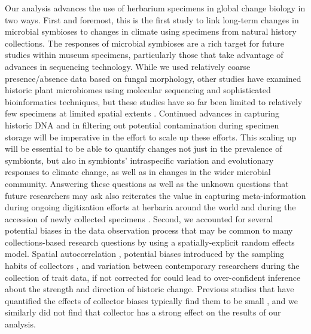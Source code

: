 \documentclass[11pt]{article}
\let\cite\citep
\begin{document}
Our analysis advances the use of herbarium specimens in global change biology in two ways. 
First and foremost, this is the first study to link long-term changes in microbial symbioses to changes in climate using specimens from natural history collections.
The responses of microbial symbioses are a rich target for future studies within museum specimens, particularly those that take advantage of advances in sequencing technology.
While we used relatively coarse presence/absence data based on fungal morphology, other studies have examined historic plant microbiomes using molecular sequencing and sophisticated bioinformatics techniques, but these studies have so far been limited to relatively few specimens at limited spatial extents \cite{yoshida2015computational,heberling2019utilizing, bieker2020metagenomic,gross2021hidden,bradshaw2021global}. 
Continued advances in capturing historic DNA and in filtering out potential contamination during specimen storage \citep{daru2019novel,bakker2020herbarium,raxworthy2021mining} will be imperative in the effort to scale up these efforts. 
This scaling up will be essential to be able to quantify changes not just in the prevalence of symbionts, but also in symbionts' intraspecific variation and evolutionary responses to climate change, as well as  in changes in the wider microbial community. 
Answering these questions as well as the unknown questions that future researchers may ask also reiterates the value in capturing meta-information during ongoing digitization efforts at herbaria around the world and during the accession of newly collected specimens \citep{lendemer2020extended,edwards2024university}.
Second, we accounted for several potential biases in the data observation process that may be common to many collections-based research questions by using a spatially-explicit random effects model. 
Spatial autocorrelation \cite{willems2022forest}, potential biases introduced by the sampling habits of collectors \citep{daru2018widespread}, and variation between contemporary researchers during the collection of trait data, if not corrected for could lead to over-confident inference about the strength and direction of historic change.
Previous studies that have quantified the effects of collector biases typically find them to be small  \cite{davis2015herbarium,meineke2019herbarium}, and we similarly did not find that collector has a strong effect on the results of our analysis.
\end{document}
